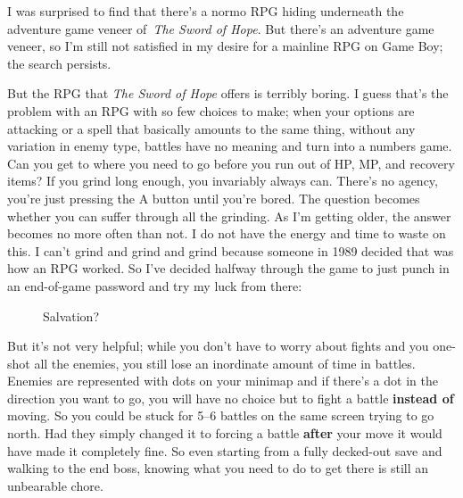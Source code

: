 \documentclass{book}
\begin{document}
I was surprised to find that there’s a normo RPG hiding underneath the adventure game veneer of~\emph{The Sword of Hope}. But there’s an adventure game veneer, so I’m still not satisfied in my desire for a mainline RPG on Game Boy; the search persists.\par
But the RPG that \emph{The Sword of Hope} offers is terribly boring. I guess that’s the problem with an RPG with so few choices to make; when your options are attacking or a spell that basically amounts to the same thing, without any variation in enemy type, battles have no meaning and turn into a numbers game. Can you get to where you need to go before you run out of HP, MP, and recovery items? If you grind long enough, you invariably always can. There’s no agency, you’re just pressing the A button until you’re bored. The question becomes whether you can suffer through all the grinding. As I’m getting older, the answer becomes no more often than not. I do not have the energy and time to waste on this. I can’t grind and grind and grind because someone in 1989 decided that was how an RPG worked. So I’ve decided halfway through the game to just punch in an end-of-game password and try my luck from there:\par
\FloatBarrier\vspace{\baselineskip}\begin{figure}[H]\caption*{Salvation?}\end{figure}
But it’s not very helpful; while you don’t have to worry about fights and you one-shot all the enemies, you still lose an inordinate amount of time in battles. Enemies are represented with dots on your minimap and if there’s a dot in the direction you want to go, you will have no choice but to fight a battle \textbf{instead of} moving. So you could be stuck for 5–6 battles on the same screen trying to go north. Had they simply changed it to forcing a battle \textbf{after} your move it would have made it completely fine. So even starting from a fully decked-out save and walking to the end boss, knowing what you need to do to get there is still an unbearable chore.\par
\FloatBarrier\vspace{\baselineskip}\centering
\begin{minipage}{0.45\linewidth}\end{minipage}\vspace{2pt}
\end{document}
